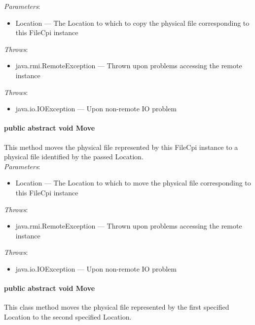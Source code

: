 \documentclass[$Date: 2003/06/26 19:29:31 $]{glabarticle}
\begin{document}
 \textit{Parameters}:
 \begin{itemize}
 \item[] Location --- The Location to which to copy the physical file corresponding to this FileCpi instance
 \end{itemize}
 
 \textit{Throws}:
 \begin{itemize}
 \item[] java.rmi.RemoteException --- Thrown upon problems accessing the remote instance 
 \end{itemize}
 
\textit{Throws}:
\begin{itemize}
\item[] java.io.IOException --- Upon non-remote IO problem 
\end{itemize}

\paragraph{public abstract void Move}

This method moves the physical file represented by this FileCpi instance
to a physical file identified by the passed Location. \\

 \textit{Parameters}:
 \begin{itemize}
 \item[] Location --- The Location to which to move the physical file corresponding to this FileCpi instance
 \end{itemize}
 
 \textit{Throws}:
 \begin{itemize}
 \item[] java.rmi.RemoteException --- Thrown upon problems accessing the remote instance 
 \end{itemize}
 
\textit{Throws}:
\begin{itemize}
\item[] java.io.IOException --- Upon non-remote IO problem 
\end{itemize}
 
\paragraph{public abstract void Move}

This class method moves the physical file represented by the first specified Location to the second specified 
Location. \\
\end{document}
